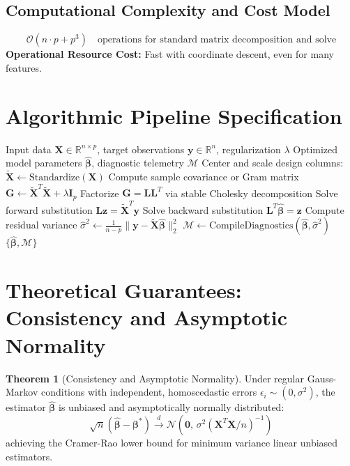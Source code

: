 \documentclass[11pt,a4paper]{article}
\theoremstyle{definition}
\newtheorem{theorem}{\textbf{Theorem}}[section]
\begin{document}
\subsection{Computational Complexity and Cost Model}
\begin{equation}
\mathcal{O}(n \cdot p + p^3) \quad \text{operations for standard matrix decomposition and solve}
\end{equation}
\textbf{Operational Resource Cost:} Fast with coordinate descent, even for many features.

\section{Algorithmic Pipeline Specification}

\begin{algorithm}[H]
\caption{Regularized regression Execution}
\begin{algorithmic}[1]
\Require Input data $\mathbf{X} \in \mathbb{R}^{n \times p}$, target observations $\mathbf{y} \in \mathbb{R}^n$, regularization $\lambda$
\Ensure Optimized model parameters $\hat{\boldsymbol{\beta}}$, diagnostic telemetry $\mathcal{M}$
\State Center and scale design columns: $\tilde{\mathbf{X}} \gets \text{Standardize}(\mathbf{X})$
\State Compute sample covariance or Gram matrix $\mathbf{G} \gets \tilde{\mathbf{X}}^T \tilde{\mathbf{X}} + \lambda \mathbf{I}_p$
\State Factorize $\mathbf{G} = \mathbf{L} \mathbf{L}^T$ via stable Cholesky decomposition
\State Solve forward substitution $\mathbf{L} \mathbf{z} = \tilde{\mathbf{X}}^T \mathbf{y}$
\State Solve backward substitution $\mathbf{L}^T \hat{\boldsymbol{\beta}} = \mathbf{z}$
\State Compute residual variance $\hat{\sigma}^2 \gets \frac{1}{n - p} \| \mathbf{y} - \tilde{\mathbf{X}} \hat{\boldsymbol{\beta}} \|_2^2$
\State $\mathcal{M} \gets \text{CompileDiagnostics}(\hat{\boldsymbol{\beta}}, \hat{\sigma}^2)$
\State \Return $\{\hat{\boldsymbol{\beta}}, \mathcal{M}\}$
\end{algorithmic}
\end{algorithm}

\section{Theoretical Guarantees: Consistency and Asymptotic Normality}

\begin{theorem}[Consistency and Asymptotic Normality]
Under regular Gauss-Markov conditions with independent, homoscedastic errors $\epsilon_i \sim (0, \sigma^2)$, the estimator $\hat{\boldsymbol{\beta}}$ is unbiased and asymptotically normally distributed:
\begin{equation}
\sqrt{n}(\hat{\boldsymbol{\beta}} - \boldsymbol{\beta}^*) \xrightarrow{d} \mathcal{N}\left(\mathbf{0}, \, \sigma^2 (\mathbf{X}^T \mathbf{X} / n)^{-1}\right)
\end{equation}
achieving the Cramer-Rao lower bound for minimum variance linear unbiased estimators.
\end{theorem}
\end{document}
